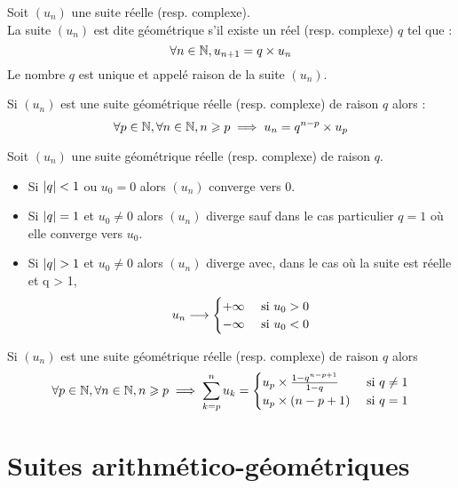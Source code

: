 \begin{defi}
    Soit \((u_n)\) une suite réelle (resp. complexe).\\
    La suite \((u_n)\) est dite géométrique s’il existe un réel (resp. complexe) \(q\) tel que :
    \[\forall n \in \mathbb{N}, u_{n+1} = q\times u_n \]
    Le nombre \(q\) est unique et appelé raison de la suite \((u_n)\).
\end{defi}

\begin{defprop}
    Si \((u_n)\) est une suite géométrique réelle (resp. complexe) de raison \(q\) alors :
    \[\forall p \in \mathbb{N}, \forall n \in \mathbb{N}, n \geqslant p \implies u_n = q^{n-p}\times u_p \]
\end{defprop}
\begin{defprop}[Limite]
    Soit \((u_n)\) une suite géométrique réelle (resp. complexe) de raison \(q\).
    \begin{itemize}
        \item Si \(\left\lvert q\right\rvert<1\) ou \(u_0 =0\) alors \((u_n)\) converge vers \(0\).
        \item Si \(\left\lvert q\right\rvert =1\) et \(u_0\neq 0\) alors \((u_n)\) diverge sauf dans le cas particulier \(q=1\) où elle converge vers \(u_0\).
        \item Si \(\left\lvert q\right\rvert>1\) et \(u_0\neq 0\) alors \((u_n)\) diverge avec, dans le cas où la suite est réelle et q > 1, \[ u_n \longrightarrow \begin{cases}
            +\infty & \text{ si } u_0>0\\
            -\infty& \text{ si } u_0<0
        \end{cases}\]

    \end{itemize}
\end{defprop}

\begin{defprop}
   Si \((u_n)\) est une suite géométrique réelle (resp. complexe) de raison \(q\) alors
    \[\forall p \in \mathbb{N}, \forall n \in \mathbb{N}, n \geqslant p \implies \sum_{k=p}^n u_k = \begin{cases}
        u_p \times \frac{1-q^{n-p+1}}{1-q} & \text{ si } q\neq 1\\
        u_p \times (n-p+1) & \text{ si } q=1
    \end{cases}\]
\end{defprop}

\section{Suites arithmético-géométriques}

